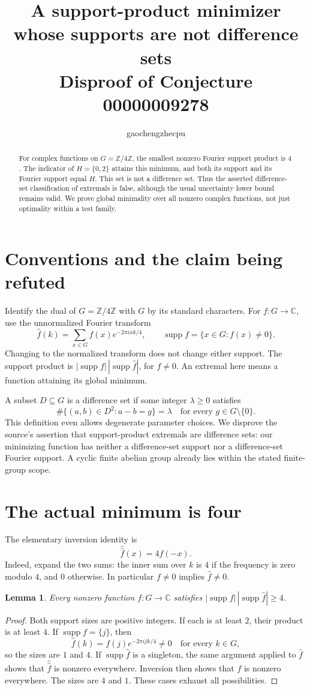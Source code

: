 \documentclass[11pt]{article}
\title{A support-product minimizer whose supports are not difference sets\\
\large Disproof of Conjecture 00000009278}
\author{gaochengzhecpu}\date{}
\newtheorem{lemma}{Lemma}
\newcommand{\Z}{\mathbb Z}
\newcommand{\C}{\mathbb C}
\newcommand{\supp}{\operatorname{supp}}
\begin{document}
\maketitle
\begin{abstract}
For complex functions on $G=\Z/4\Z$, the smallest nonzero Fourier
support product is $4$. The indicator of $H=\{0,2\}$ attains this
minimum, and both its support and its Fourier support equal $H$.
This set is not a difference set. Thus the asserted difference-set
classification of extremals is false, although the usual uncertainty
lower bound remains valid. We prove global minimality over all
nonzero complex functions, not just optimality within a test family.
\end{abstract}

\section*{Conventions and the claim being refuted}
Identify the dual of $G=\Z/4\Z$ with $G$ by its standard characters.
For $f:G\to\C$, use the unnormalized Fourier transform
\[
 \widehat f(k)=\sum_{x\in G}f(x)e^{-2\pi i xk/4},\qquad
 \supp f=\{x\in G:f(x)\ne0\}.
\]
Changing to the normalized transform does not change either support.
The support product is $|\supp f|\,|\supp\widehat f|$, for $f\ne0$.
An extremal here means a function attaining its global minimum.

A subset $D\subseteq G$ is a difference set if some integer
$\lambda\ge0$ satisfies
\[
 \#\{(a,b)\in D^2:a-b=g\}=\lambda
       \quad\text{for every }g\in G\setminus\{0\}.
\]
This definition even allows degenerate parameter choices. We disprove
the source's assertion that support-product extremals are difference
sets: our minimizing function has neither a difference-set support
nor a difference-set Fourier support. A cyclic finite abelian group
already lies within the stated finite-group scope.

\section*{The actual minimum is four}
The elementary inversion identity is
\[
 \widehat{\widehat f}(x)=4f(-x).
\]
Indeed, expand the two sums: the inner sum over $k$ is $4$ if the
frequency is zero modulo $4$, and $0$ otherwise. In particular
$f\ne0$ implies $\widehat f\ne0$.

\begin{lemma}
Every nonzero function $f:G\to\C$ satisfies
$|\supp f|\,|\supp\widehat f|\ge4$.
\end{lemma}
\begin{proof}
Both support sizes are positive integers. If each is at least $2$,
their product is at least $4$.
If $\supp f=\{j\}$, then
\[
 \widehat f(k)=f(j)e^{-2\pi i jk/4}\ne0
           \quad\text{for every }k\in G,
\]
so the sizes are $1$ and $4$.
If $\supp\widehat f$ is a singleton, the same argument applied to
$\widehat f$ shows that $\widehat{\widehat f}$ is nonzero everywhere.
Inversion then shows that $f$ is nonzero everywhere. The sizes are
$4$ and $1$. These cases exhaust all possibilities.
\end{proof}
\end{document}
